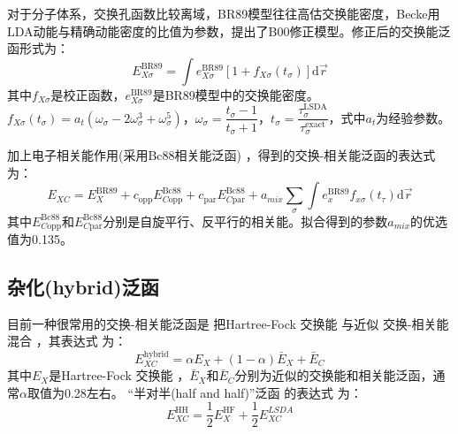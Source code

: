 对于分子体系，交换孔函数比较离域，BR89模型往往高估交换能密度，Becke用LDA动能与精确动能密度的比值为参数，提出了B00修正模型\cite{JCP112-4020_2000}。修正后的交换能泛函形式为：
\begin{equation}
	E_{X\sigma}^{\mathrm{BR89}}=\int e_{X\sigma}^{\mathrm{BR89}}[1+f_{X\sigma}(t_{\sigma})
  ]\textrm{d}\vec r
  \label{eq:dft-24}
\end{equation}
其中$f_{X\sigma}$是校正函数，$e_{X\sigma}^{\mathrm{BR89}}$是BR89模型中的交换能密度。$f_{X\sigma}(t_{\sigma})=a_t(\omega_{\sigma}-2\omega_{\sigma}^3+\omega_{\sigma}^5)$，$\omega_{\sigma}=\dfrac{t_{\sigma}-1}{t_{\sigma}+1}$，$t_{\sigma}=\dfrac{\tau_{\sigma}^{\mathrm{LSDA}}}{\tau_{\sigma}^{\mathrm{exact}}}$，式中$a_t$为经验参数。

加上{电子}相关{能}作用(采用Bc88相关能泛函\cite{JCP88-1053_1988})
，得到的交换-相关能{泛函的}表达式为：
\begin{equation}
	E_{XC}=E_X^{\mathrm{BR89}}+c_{\mathrm{opp}}E_{C\mathrm{opp}}^{\mathrm{Bc88}}+c_{\mathrm{par}}E_{C\mathrm{par}}^{\mathrm{Bc88}}+a_{mix}\sum_{\sigma}\int e_x^{\mathrm{BR89}}f_{x\sigma}(t_{\tau})\textrm{d}\vec r
  \label{eq:dft-25}
\end{equation}
其中$E_{C\mathrm{opp}}^{\mathrm{Bc88}}$和$E_{C\mathrm{par}}^{\mathrm{Bc88}}$分别是自旋平行、反平行的相关能。拟合得到的参数$a_{mix}$的优选值为0.135。

\subsection{{杂化(hybrid)}泛函}
{目前}一种很常用的交换-相关能{泛函}是%
把Hartree-Fock%
{交换}能%
与近似%
交换-相关能%
混合%
\cite{JCP104-1040_1996,JCP98-5648_1993}，其表达式%
为：
\begin{equation}
	E_{XC}^{\mathrm{hybrid}}=\alpha E_X+(1-\alpha)\bar{E}_X+\bar{E}_C
 \label{eq:dft-11}
\end{equation}
其中$E_X$是Hartree-Fock%
{交换}能%
，$\bar{E}_X$和$\bar{E}_C$分别为近似的交换能和相关能泛函，通常$\alpha$取值为0.28左右。%
“半对半(half and half)”泛函\cite{JCP98-1372_1993}%
{的}表达式%
{为}：
\begin{equation}
	E_{XC}^{\mathrm{HH}}=\dfrac12E_{X}^{\mathrm{HF}}+\dfrac12E_{XC}^{LSDA}
  \label{eq:dft-26}
\end{equation}

